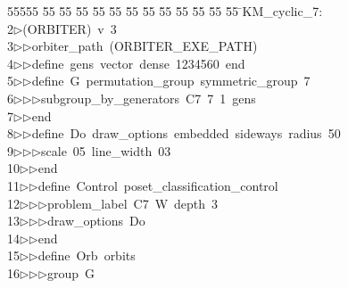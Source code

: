 %
%
\begin{tabbing}
55555 \= 55 \= 55 \= 55 \= 55 \= 55 \= 55 \= 55 \= 55 \= 55 \= 55 \= 55 \= 55 \= \>KM\_cyclic\_7:\\[0pt]
2\>$\triangleright$\>(ORBITER)\ v\ 3\ \\[0pt]
3\>$\triangleright$\>$\triangleright$\>orbiter\_path\ (ORBITER\_EXE\_PATH)\ \\[0pt]
4\>$\triangleright$\>$\triangleright$\>define\ gens\ vector\ dense\ 1234560\ end\ \\[0pt]
5\>$\triangleright$\>$\triangleright$\>define\ G\ permutation\_group\ symmetric\_group\ 7\ \\[0pt]
6\>$\triangleright$\>$\triangleright$\>$\triangleright$\>subgroup\_by\_generators\ C7\ 7\ 1\ gens\ \\[0pt]
7\>$\triangleright$\>$\triangleright$\>end\ \\[0pt]
8\>$\triangleright$\>$\triangleright$\>define\ Do\ draw\_options\ embedded\ sideways\ radius\ 50\ \\[0pt]
9\>$\triangleright$\>$\triangleright$\>$\triangleright$\>scale\ 05\ line\_width\ 03\ \\[0pt]
10\>$\triangleright$\>$\triangleright$\>end\ \\[0pt]
11\>$\triangleright$\>$\triangleright$\>define\ Control\ poset\_classification\_control\ \\[0pt]
12\>$\triangleright$\>$\triangleright$\>$\triangleright$\>problem\_label\ C7\ W\ depth\ 3\ \\[0pt]
13\>$\triangleright$\>$\triangleright$\>$\triangleright$\>draw\_options\ Do\ \\[0pt]
14\>$\triangleright$\>$\triangleright$\>end\ \\[0pt]
15\>$\triangleright$\>$\triangleright$\>define\ Orb\ orbits\ \\[0pt]
16\>$\triangleright$\>$\triangleright$\>$\triangleright$\>group\ G\ \\[0pt]

\end{tabbing}
